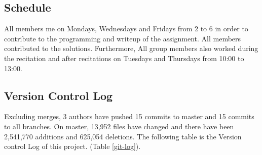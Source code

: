 \documentclass[journal,10pt,onecolumn,compsoc,letterpaper,draftclsnofoot,table,xcdraw]{IEEEtran} \usepackage[margin=0.75in]{geometry}
\begin{document}
\subsection{Schedule}
\noindent All members me on Mondays, Wednesdays and Fridays from 2 to 6 in order to contribute to the programming and writeup of the assignment. All members contributed to the solutions. Furthermore, All group members also worked during the recitation and after recitations on Tuesdays and Thursdays from 10:00 to 13:00.
\subsection{Version Control Log}
\noindent Excluding merges, 3 authors have pushed 15 commits to master and 15 commits to all branches. On master, 13,952 files have changed and there have been 2,541,770 additions and 625,054 deletions. The following table is the Version control Log of this project. (Table \ref{git-log}).
\end{document}
